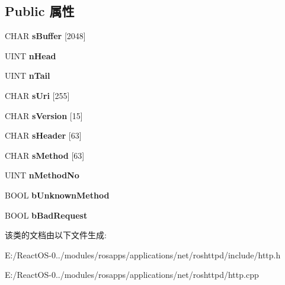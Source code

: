 \subsection*{Public 属性}
\begin{DoxyCompactItemize}
\item 
\mbox{\label{class_c_http_parser_aa5d74ab5c85a4bf7f59fe23e5a904d4d}} 
C\+H\+AR {\bfseries s\+Buffer} \mbox{[}2048\mbox{]}
\item 
\mbox{\label{class_c_http_parser_aa987b2039457756ef69d59d452650490}} 
U\+I\+NT {\bfseries n\+Head}
\item 
\mbox{\label{class_c_http_parser_a99ea9ba27754ed59d89fcdfd52ba7890}} 
U\+I\+NT {\bfseries n\+Tail}
\item 
\mbox{\label{class_c_http_parser_aae0437846ccba39b6c7318c480c48bdd}} 
C\+H\+AR {\bfseries s\+Uri} \mbox{[}255\mbox{]}
\item 
\mbox{\label{class_c_http_parser_a3e6fc0829b4da379beb60ab68a7f024a}} 
C\+H\+AR {\bfseries s\+Version} \mbox{[}15\mbox{]}
\item 
\mbox{\label{class_c_http_parser_aae4acc40cacf8fbfb2c1cbf09c39c9b8}} 
C\+H\+AR {\bfseries s\+Header} \mbox{[}63\mbox{]}
\item 
\mbox{\label{class_c_http_parser_a01e6b1ebb1931e7a3cfb0470a834a0ad}} 
C\+H\+AR {\bfseries s\+Method} \mbox{[}63\mbox{]}
\item 
\mbox{\label{class_c_http_parser_ad76ee50bf527e692fb0fc2a1db927b58}} 
U\+I\+NT {\bfseries n\+Method\+No}
\item 
\mbox{\label{class_c_http_parser_affd00680609ab290ac28602d98d35568}} 
B\+O\+OL {\bfseries b\+Unknown\+Method}
\item 
\mbox{\label{class_c_http_parser_ad4da978e40e095a3de99a541b8273e19}} 
B\+O\+OL {\bfseries b\+Bad\+Request}
\end{DoxyCompactItemize}


该类的文档由以下文件生成\+:\begin{DoxyCompactItemize}
\item 
E\+:/\+React\+O\+S-\/0../modules/rosapps/applications/net/roshttpd/include/http.\+h\item 
E\+:/\+React\+O\+S-\/0../modules/rosapps/applications/net/roshttpd/http.\+cpp\end{DoxyCompactItemize}
